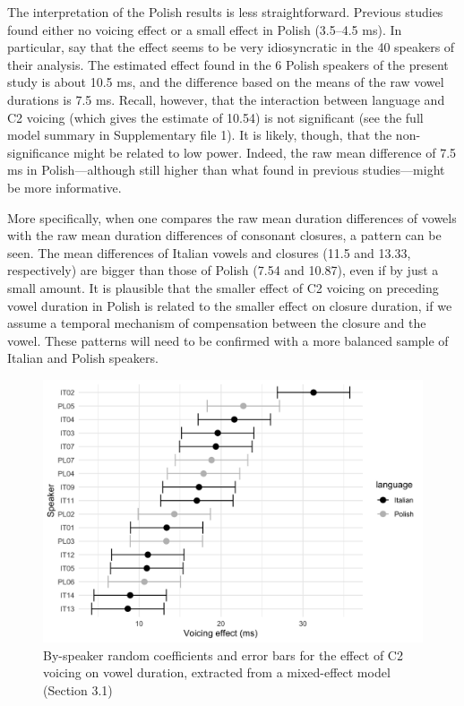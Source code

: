 \documentclass[charis]{glossa}
\begin{document}
The interpretation of the Polish results is less straightforward.
Previous studies found either no voicing effect or a small effect in
Polish (3.5--4.5 ms). In particular, \citet{malisz2008} say that the
effect seems to be very idiosyncratic in the 40 speakers of their
analysis. The estimated effect found in the 6 Polish speakers of the
present study is about 10.5 ms, and the difference based on the means of
the raw vowel durations is 7.5 ms. Recall, however, that the interaction
between language and C2 voicing (which gives the estimate of 10.54) is
not significant (see the full model summary in Supplementary file 1). It
is likely, though, that the non-significance might be related to low
power. Indeed, the raw mean difference of 7.5 ms in Polish---although
still higher than what found in previous studies---might be more
informative.

More specifically, when one compares the raw mean duration differences
of vowels with the raw mean duration differences of consonant closures,
a pattern can be seen. The mean differences of Italian vowels and
closures (11.5 and 13.33, respectively) are bigger than those of Polish
(7.54 and 10.87), even if by just a small amount. It is plausible that
the smaller effect of C2 voicing on preceding vowel duration in Polish
is related to the smaller effect on closure duration, if we assume a
temporal mechanism of compensation between the closure and the vowel.
These patterns will need to be confirmed with a more balanced sample of
Italian and Polish speakers.

\begin{figure}
\includegraphics[width=\linewidth]{./Figure6} \caption{By-speaker random coefficients and error bars for the effect of C2 voicing on vowel duration, extracted from a mixed-effect model (Section 3.1)}\label{f:Figure6}
\end{figure}
\end{document}
